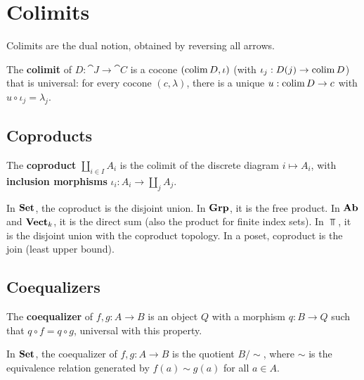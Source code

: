 \section{Colimits}

Colimits are the dual notion, obtained by reversing all arrows.

\begin{definition}[Colimit]
The \textbf{colimit} of $D: \cat{J} \to \cat{C}$ is a cocone $(\operatorname{colim} D, \iota)$ (with $\iota_j: D(j) \to \operatorname{colim} D$) that is universal: for every cocone $(c, \lambda)$, there is a unique $u: \operatorname{colim} D \to c$ with $u \circ \iota_j = \lambda_j$.
\end{definition}

\subsection{Coproducts}

\begin{definition}[Coproduct]
The \textbf{coproduct} $\coprod_{i \in I} A_i$ is the colimit of the discrete diagram $i \mapsto A_i$, with \textbf{inclusion morphisms} $\iota_i: A_i \to \coprod_j A_j$.
\end{definition}

\begin{example}
In $\mathbf{Set}$, the coproduct is the disjoint union. In $\mathbf{Grp}$, it is the free product. In $\mathbf{Ab}$ and $\mathbf{Vect}_k$, it is the direct sum (also the product for finite index sets). In $\Top$, it is the disjoint union with the coproduct topology. In a poset, coproduct is the join (least upper bound).
\end{example}

\subsection{Coequalizers}

\begin{definition}[Coequalizer]
The \textbf{coequalizer} of $f, g: A \to B$ is an object $Q$ with a morphism $q: B \to Q$ such that $q \circ f = q \circ g$, universal with this property.
\end{definition}

\begin{example}
In $\mathbf{Set}$, the coequalizer of $f, g: A \to B$ is the quotient $B / {\sim}$, where $\sim$ is the equivalence relation generated by $f(a) \sim g(a)$ for all $a \in A$.
\end{example}

